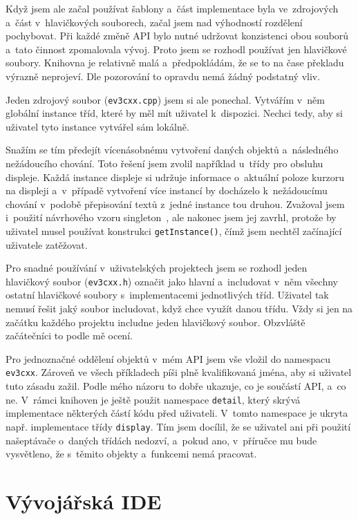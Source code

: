 Když jsem ale začal používat šablony a~část implementace byla ve~zdrojových a~část v~hlavičkových souborech, začal jsem nad výhodností rozdělení pochybovat.
Při každé změně API bylo nutné udržovat konzistenci obou souborů a~tato činnost zpomalovala vývoj. 
Proto jsem se rozhodl používat jen hlavičkové soubory. Knihovna je relativně malá a~předpokládám, že se to na čase překladu výrazně neprojeví.
Dle pozorování to opravdu nemá žádný podstatný vliv.

Jeden zdrojový soubor (\texttt{ev3cxx.cpp}) jsem si ale ponechal. 
Vytvářím v~něm globální instance tříd, které by měl mít uživatel  k~dispozici. 
Nechci tedy, aby si uživatel tyto instance vytvářel sám lokálně.

Snažím se tím předejít vícenásobnému vytvoření daných objektů a~následného nežádoucího chování.
Toto řešení jsem zvolil například u~třídy pro obsluhu displeje. Každá instance displeje si udržuje informace o~aktuální poloze kurzoru na displeji a~v~případě vytvoření více instancí by docházelo k~nežádoucímu chování v~podobě přepisování textů z~jedné instance tou druhou.
Zvažoval jsem i~použití návrhového vzoru singleton~\cite{design-pattern-singleton}, ale nakonec jsem jej zavrhl, protože by uživatel musel používat konstrukci \texttt{getInstance()}, čímž jsem nechtěl začínající uživatele zatěžovat.

Pro snadné používání v~uživatelských projektech jsem se rozhodl jeden hlavičkový soubor (\texttt{ev3cxx.h}) označit jako hlavní a~includovat v~něm všechny ostatní hlavičkové soubory s~implementacemi jednotlivých tříd.
Uživatel tak nemusí řešit jaký soubor includovat, když chce využít danou třídu.
Vždy si jen na začátku každého projektu includne jeden hlavičkový soubor.
Obzvláště začátečníci to podle mě ocení.

Pro jednoznačné oddělení objektů v~mém API jsem vše vložil do namespacu \texttt{ev3cxx}. 
Zároveň ve všech příkladech píši plně kvalifikovaná jména, aby si uživatel tuto zásadu zažil. 
Podle mého názoru to dobře ukazuje, co je součástí API, a~co ne.
V~rámci knihoven je ještě použit namespace \texttt{detail}, který skrývá implementace některých částí kódu před uživateli.
V~tomto namespace je ukryta např.  implementace třídy \texttt{display}. 
Tím jsem docílil, že se uživatel ani při použití našeptávače o~daných třídách nedozví, a~pokud ano, v~příručce mu bude vysvětleno, že s~těmito objekty a~funkcemi nemá pracovat.



\section{Vývojářská IDE}

